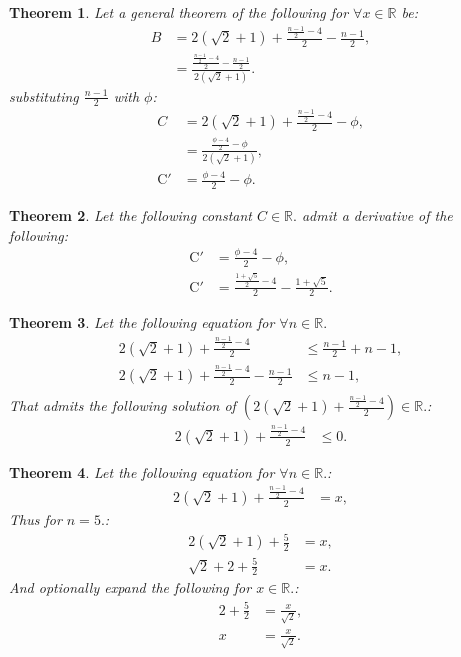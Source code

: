 \documentclass[10pt]{article}
\theoremstyle{plain}
\newtheorem{theorem}{Theorem}[section]
\theoremstyle{definition}
\theoremstyle{remark}
\begin{document}
\begin{theorem}
	Let a general theorem of the following for $\forall x \in \mathbb{R}$ be:
	\begin{align*}
		B &= 2(\sqrt{2} + 1) + \frac{\frac{n - 1}{2} - 4}{2} - \frac{n - 1}{2},\\
		&= \frac{\frac{\frac{n - 1}{2} - 4}{2} - \frac{n - 1}{2}}{2(\sqrt{2} + 1)}.
	\end{align*}
	substituting $\frac{n - 1}{2}$ with $\phi$:
	\begin{align*}
		C &= 2(\sqrt{2} + 1) + \frac{\frac{n - 1}{2} - 4}{2} - \phi,\\
		&= \frac{\frac{\phi - 4}{2} - \phi}{2(\sqrt{2} + 1)},\\
		\mathrm{C}' &= \frac{\phi - 4}{2} - \phi.
	\end{align*}
\end{theorem}

\begin{theorem}
	Let the following constant $C \in \mathbb{R}.$ admit a derivative of the following:
	\begin{align*}
		\mathrm{C}' &= \frac{\phi - 4}{2} - \phi,\\
		\mathrm{C}' &= \frac{\frac{1+\sqrt{5}}{2} - 4}{2} - \frac{1+\sqrt{5}}{2}.
	\end{align*}
\end{theorem}

\begin{theorem}
	Let the following equation for $\forall n \in \mathbb{R}.$
	\begin{align*}
		2(\sqrt{2} + 1) + \frac{\frac{n - 1}{2} - 4}{2}  &\leq \frac{n - 1}{2} + n - 1,\\
		2(\sqrt{2} + 1) + \frac{\frac{n - 1}{2} - 4}{2} - \frac{n - 1}{2} &\leq n - 1,\\
	\end{align*}
	 That admits the following solution of $(2(\sqrt{2} + 1) + \frac{\frac{n - 1}{2} - 4}{2}) \in \mathbb{R}.$:
	\begin{align*}
	 	2(\sqrt{2} + 1) + \frac{\frac{n - 1}{2} - 4}{2} &\leq 0.
	\end{align*}
\end{theorem}

\begin{theorem}
	Let the following equation for $\forall n \in \mathbb{R}.$:
	\begin{align*}
		2(\sqrt{2} + 1) + \frac{\frac{n - 1}{2} - 4}{2} &= x,
	\end{align*}
	Thus for $n=5.$:
	\begin{align*}
		2(\sqrt{2} + 1) + \frac{5}{2} &= x,\\
		\sqrt{2}+2 + \frac{5}{2} &= x.
	\end{align*}
	And optionally expand the following for $x \in \mathbb{R}.$:
	\begin{align*}
		2+\frac{5}{2} &= \frac{x}{\sqrt{2}},\\
		x &= \frac{x}{\sqrt{2}}.
	\end{align*}
\end{theorem}
\end{document}

